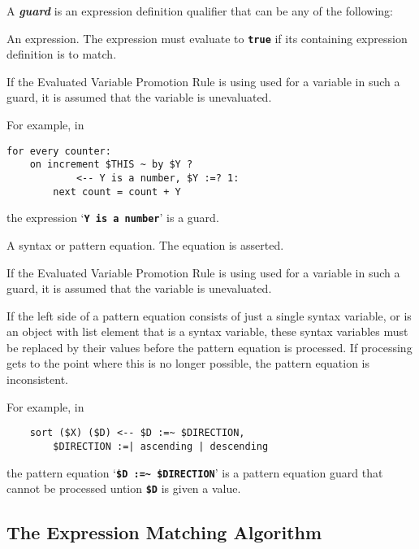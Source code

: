 \documentclass[12pt]{article}
\newcommand{\TT}[1]{{\tt \bfseries #1}}
\newcommand{\key}[1]{{\bf \em #1}\index{#1}}
\newcommand{\TILDE}{\textasciitilde}
\newenvironment{indpar}[1][0.3in]%
	{\begin{list}{}%
		     {\setlength{\itemsep}{0in}%
		      \setlength{\topsep}{0in}%
		      \setlength{\parsep}{1ex}%
		      \setlength{\labelwidth}{#1}%
		      \setlength{\leftmargin}{#1}%
		      \addtolength{\leftmargin}{\labelsep}}%
	 \item}%
	{\end{list}}
\begin{document}
A \key{guard} is an expression definition qualifier that
can be any of the following:
\begin{enumerate}
\item An expression.  The expression must evaluate
to \TT{true} if its containing expression definition is to
match.

If the Evaluated Variable Promotion Rule is using used for
a variable in such a guard, it is assumed that the variable
is unevaluated.

For example, in
\begin{indpar}\begin{verbatim}
for every counter:
    on increment $THIS ~ by $Y ?
            <-- Y is a number, $Y :=? 1:
        next count = count + Y
\end{verbatim}\end{indpar}

the expression `\TT{Y is a number}' is a guard.

\item
A syntax or pattern equation.  The equation is asserted.

If the Evaluated Variable Promotion Rule is using used for
a variable in such a guard, it is assumed that the variable
is unevaluated.

If the left side of a pattern equation consists of just a single
syntax variable, or is an object with list element that is a syntax variable,
these syntax variables must be replaced by their
values before the pattern equation is processed.
If processing gets to the point where this is no longer possible,
the pattern equation is inconsistent.

For example, in
\begin{indpar}\begin{verbatim}
    sort ($X) ($D) <-- $D :=~ $DIRECTION,
        $DIRECTION :=| ascending | descending
\end{verbatim}\end{indpar}

the pattern equation `\TT{\$D :=\TILDE{} \$DIRECTION}' is a
pattern equation guard that cannot be processed untion \TT{\$D} is
given a value.

\end{enumerate}

\subsection{The Expression Matching Algorithm}
\label{EXPRESSION-MATCHING-ALGORITHM}
\end{document}
